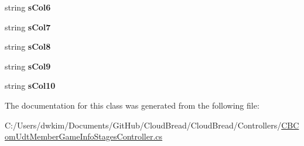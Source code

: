 \begin{DoxyCompactItemize}
\item 
string {\bfseries s\+Col6}\hypertarget{class_cloud_bread_1_1_controllers_1_1_c_b_com_udt_member_game_info_stages_controller_1_1_input_params_af0eebcfc8aaeef84138d69192de643ec}{}\label{class_cloud_bread_1_1_controllers_1_1_c_b_com_udt_member_game_info_stages_controller_1_1_input_params_af0eebcfc8aaeef84138d69192de643ec}

\item 
string {\bfseries s\+Col7}\hypertarget{class_cloud_bread_1_1_controllers_1_1_c_b_com_udt_member_game_info_stages_controller_1_1_input_params_a4ed66833fcba791460baccd6ad43aacb}{}\label{class_cloud_bread_1_1_controllers_1_1_c_b_com_udt_member_game_info_stages_controller_1_1_input_params_a4ed66833fcba791460baccd6ad43aacb}

\item 
string {\bfseries s\+Col8}\hypertarget{class_cloud_bread_1_1_controllers_1_1_c_b_com_udt_member_game_info_stages_controller_1_1_input_params_a82668b88a883d838eeeb9ee8eaa0866b}{}\label{class_cloud_bread_1_1_controllers_1_1_c_b_com_udt_member_game_info_stages_controller_1_1_input_params_a82668b88a883d838eeeb9ee8eaa0866b}

\item 
string {\bfseries s\+Col9}\hypertarget{class_cloud_bread_1_1_controllers_1_1_c_b_com_udt_member_game_info_stages_controller_1_1_input_params_a68d1ee1ca7a63e21a3297e5f58f7492f}{}\label{class_cloud_bread_1_1_controllers_1_1_c_b_com_udt_member_game_info_stages_controller_1_1_input_params_a68d1ee1ca7a63e21a3297e5f58f7492f}

\item 
string {\bfseries s\+Col10}\hypertarget{class_cloud_bread_1_1_controllers_1_1_c_b_com_udt_member_game_info_stages_controller_1_1_input_params_af68a7f967c2381e784f7d49e3b725e54}{}\label{class_cloud_bread_1_1_controllers_1_1_c_b_com_udt_member_game_info_stages_controller_1_1_input_params_af68a7f967c2381e784f7d49e3b725e54}

\end{DoxyCompactItemize}


The documentation for this class was generated from the following file\+:\begin{DoxyCompactItemize}
\item 
C\+:/\+Users/dwkim/\+Documents/\+Git\+Hub/\+Cloud\+Bread/\+Cloud\+Bread/\+Controllers/\hyperlink{_c_b_com_udt_member_game_info_stages_controller_8cs}{C\+B\+Com\+Udt\+Member\+Game\+Info\+Stages\+Controller.\+cs}\end{DoxyCompactItemize}

